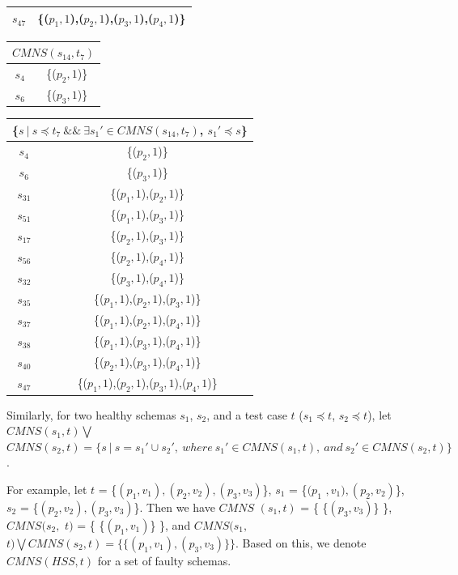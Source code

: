 {\begin{table}[htbp]
\begin{tabular}{|c|c|}
   $s_{47}$ & \{($p_{1}, 1$),($p_{2}, 1$),($p_{3}, 1$),($p_{4}, 1$)\} \\
   \hline
    \end{tabular}%
\quad
    \begin{tabular}{|c|c|} \hline
     \multicolumn{2}{|c|}{$CMNS(s_{14}, t_{7})$} \\ \hline
   $s_{4}$ & \{($p_{2}, 1$)\} \\
   $s_{6}$ & \{($p_{3}, 1$)\} \\
    \hline
    \end{tabular}%
\quad
    \begin{tabular}{|c|c|} \hline
   \multicolumn{2}{|c|}{\{$ s\ |\ s \preceq t_{7}\ \&\& \ \exists s_{1}' \in CMNS(s_{14}, t_{7})$, $s_{1}' \preceq s$\}}\\ \hline
   $s_{4}$ & \{($p_{2}, 1$)\} \\
   $s_{6}$ & \{($p_{3}, 1$)\} \\

   $s_{31}$ & \{($p_{1}, 1$),($p_{2}, 1$)\} \\
   $s_{51}$ & \{($p_{1}, 1$),($p_{3}, 1$)\} \\
   $s_{17}$ & \{($p_{2}, 1$),($p_{3}, 1$)\} \\
   $s_{56}$ & \{($p_{2}, 1$),($p_{4}, 1$)\} \\
   $s_{32}$ & \{($p_{3}, 1$),($p_{4}, 1$)\} \\

   $s_{35}$ & \{($p_{1}, 1$),($p_{2}, 1$),($p_{3}, 1$)\} \\
   $s_{37}$ & \{($p_{1}, 1$),($p_{2}, 1$),($p_{4}, 1$)\} \\
   $s_{38}$ & \{($p_{1}, 1$),($p_{3}, 1$),($p_{4}, 1$)\} \\
   $s_{40}$ & \{($p_{2}, 1$),($p_{3}, 1$),($p_{4}, 1$)\} \\

   $s_{47}$ & \{($p_{1}, 1$),($p_{2}, 1$),($p_{3}, 1$),($p_{4}, 1$)\} \\
   \hline
    \end{tabular}%
\end{table}


Similarly, for two healthy schemas $s_{1}$, $s_{2}$, and a test case $t$ ($s_{1} \preceq t$, $s_{2} \preceq t$), let $CMNS(s_{1}, t) \bigvee $ $CMNS(s_{2}, t)  = \{ s\ |\ s = s_{1}' \cup s_{2}',\ where\ s_{1}' \in CMNS(s_{1}, t),\ and\ s_{2}' \in CMNS(s_{2}, t) \}$.

For example, let $t$ = \{$(p_{1},v_{1}), (p_{2}, v_{2}), (p_{3}, v_{3})$\}, $s_{1}$ = \{$(p_{1}$ $, v_{1}), (p_{2}, v_{2})$\}, $s_{2}$ = \{$(p_{2}, v_{2}), (p_{3}, v_{3})$\}. Then we have $CMNS$ $(s_{1}, t)$ = \{ \{$(p_{3}, v_{3})$\} \}, $CMNS(s_{2},$ $ t)$ = \{ \{$(p_{1}, v_{1})$\} \}, and  $CMNS(s_{1},$ $ t) \bigvee CMNS(s_{2}, t) = \{ \{(p_{1}, v_{1}), (p_{3}, v_{3})\} \} $. Based on this, we denote $CMNS(HSS,t)$ for a set of faulty schemas.


}
